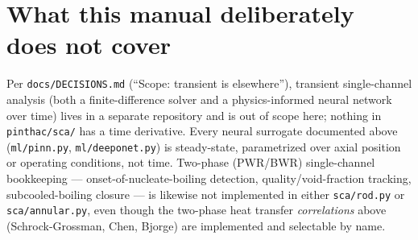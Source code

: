 \documentclass[11pt]{article}
\newcommand{\code}[1]{\texttt{#1}}
\begin{document}
\section*{What this manual deliberately does not cover}

Per \code{docs/DECISIONS.md} (``Scope: transient is elsewhere''), transient
single-channel analysis (both a finite-difference solver and a physics-informed neural
network over time) lives in a separate repository and is out of scope here; nothing in
\code{pinthac/sca/} has a time derivative. Every neural surrogate documented above
(\code{ml/pinn.py}, \code{ml/deeponet.py}) is steady-state, parametrized over axial
position or operating conditions, not time. Two-phase (PWR/BWR) single-channel
bookkeeping --- onset-of-nucleate-boiling detection, quality/void-fraction tracking,
subcooled-boiling closure --- is likewise not implemented in either
\code{sca/rod.py} or \code{sca/annular.py}, even though the two-phase heat transfer
\emph{correlations} above (Schrock-Grossman, Chen, Bjorge) are implemented and
selectable by name.
\end{document}
